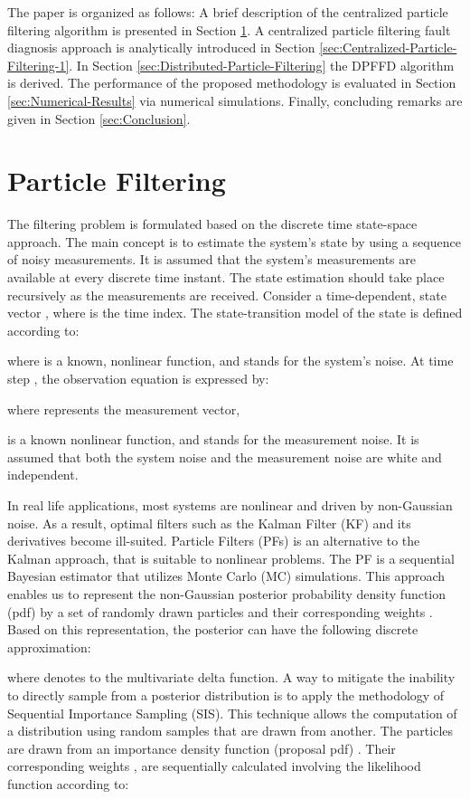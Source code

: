 \documentclass[10pt,twocolumn,twoside]{IEEEtran}
\begin{document}
The paper is organized as follows: A brief description of the centralized
particle filtering algorithm is presented in Section \ref{sec:Centralized-Particle-Filtering}. A
centralized particle filtering fault diagnosis approach is analytically introduced in Section \ref{sec:Centralized-Particle-Filtering-1}. In Section \ref{sec:Distributed-Particle-Filtering} the DPFFD algorithm is derived. The performance of the proposed methodology is evaluated in Section \ref{sec:Numerical-Results} via numerical simulations. Finally, concluding remarks are given in Section \ref{sec:Conclusion}.

\section{Particle Filtering} \label{sec:Centralized-Particle-Filtering}

The filtering problem is formulated based on the discrete time state-space
approach. The main concept is to estimate the system's state by using
a sequence of noisy measurements. It is assumed that the system's
measurements are available at every discrete time instant. The state
estimation should take place recursively as the measurements are received.
Consider a time-dependent, state vector ,
where  is the time index. The state-transition
model of the state  is defined according to:

where 
is a known, nonlinear function, and  stands
for the system's noise. At time step , the observation equation
is expressed by:

where  represents the measurement vector,

is a known nonlinear function, and 
stands for the measurement noise. It is assumed that both the system
noise  and the measurement noise  are white and independent. 

In real life applications, most systems are nonlinear and driven by
non-Gaussian noise. As a result, optimal filters such as the Kalman
Filter (KF) and its derivatives become ill-suited. Particle Filters
(PFs) is an alternative to the Kalman approach, that is suitable to
nonlinear problems. The PF is a sequential Bayesian estimator that
utilizes Monte Carlo (MC) simulations. This approach enables us to
represent the non-Gaussian posterior probability density function
(pdf)  by a set of  randomly drawn particles
 and their corresponding weights . Based on
this representation, the posterior can have the following discrete
approximation:

where  denotes to the multivariate delta function.
A way to mitigate the inability to directly sample from a posterior
distribution is to apply the methodology of Sequential Importance
Sampling (SIS). This technique allows the computation of a distribution
using random samples that are drawn from another. The particles 
are drawn from an importance density function (proposal pdf) .
Their corresponding weights , are sequentially
calculated involving the likelihood function according to:
\end{document}
